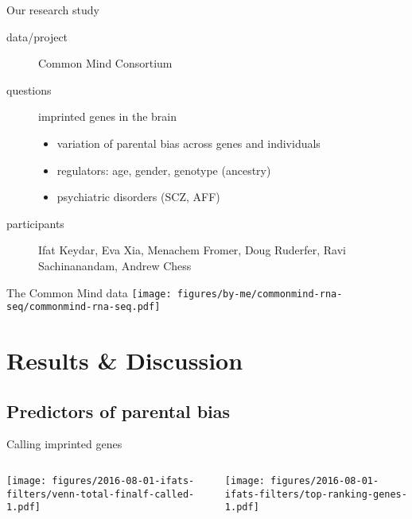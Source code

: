 \documentclass{beamer}
\begin{document}
\begin{frame}{Our research study}
\begin{description}
\item[data/project] Common Mind Consortium
\item[questions] imprinted genes in the brain
\begin{itemize}
\item variation of parental bias across genes and individuals
\item regulators: age, gender, genotype (ancestry)
\item psychiatric disorders (SCZ, AFF)  
\end{itemize}
\item[participants] \alert{Ifat Keydar}, Eva Xia, Menachem Fromer, Doug Ruderfer, Ravi Sachinanandam, Andrew Chess
\end{description}
\end{frame}

\begin{frame}[label=cmc]{The Common Mind data}
\texttt{[image: figures/by-me/commonmind-rna-seq/commonmind-rna-seq.pdf]}
\end{frame}

\section{Results \& Discussion}
\subsection{Predictors of parental bias}

\begin{frame}{Calling imprinted genes}
\begin{columns}[t]
\begin{column}{0.5\textwidth}

\texttt{[image: figures/2016-08-01-ifats-filters/venn-total-finalf-called-1.pdf]}
\end{column}

\begin{column}{0.5\textwidth}

\texttt{[image: figures/2016-08-01-ifats-filters/top-ranking-genes-1.pdf]}
\end{column}
\end{columns}
\end{frame}
\end{document}
